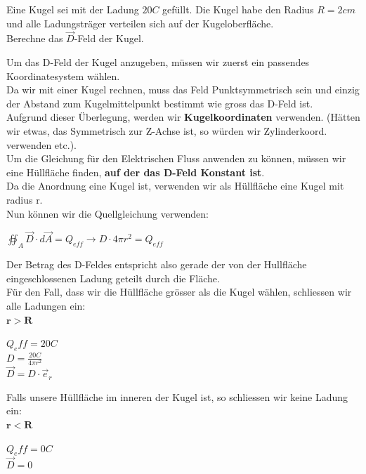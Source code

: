 \iend

\beginbsp
Eine Kugel sei mit der Ladung $20 C$ gefüllt. Die Kugel habe den Radius $R = 2cm$ und alle Ladungsträger verteilen sich auf der Kugeloberfläche. \\
Berechne das $\vec{D}$-Feld der Kugel.
\iend

\beginbsp
Um das D-Feld der Kugel anzugeben, müssen wir zuerst ein passendes Koordinatesystem wählen. \\
Da wir mit einer Kugel rechnen, muss das Feld Punktsymmetrisch sein und einzig der Abstand zum Kugelmittelpunkt bestimmt wie gross das D-Feld ist. \\
Aufgrund dieser Überlegung, werden wir \textbf{Kugelkoordinaten} verwenden. (Hätten wir etwas, das Symmetrisch zur Z-Achse ist, so würden wir Zylinderkoord. verwenden etc.). \\
Um die Gleichung für den Elektrischen Fluss anwenden zu können, müssen wir eine Hüllfläche finden,   \textbf{auf der das D-Feld Konstant ist}. \\
Da die Anordnung eine Kugel ist, verwenden wir als Hüllfläche eine Kugel mit radius r. \\
Nun können wir die Quellgleichung verwenden:
\begin{center}
	$ \oiint_A \vec{D}\cdot d\vec{A} = Q_{eff} \rightarrow D \cdot  4\pi r^2  = Q_{eff} $
\end{center}
Der Betrag des D-Feldes entspricht also gerade der von der Hullfläche eingeschlossenen Ladung geteilt durch die Fläche. \\
Für den Fall, dass wir die Hüllfläche grösser als die Kugel wählen, schliessen wir alle Ladungen ein: \\
$\mathbf{r > R}$ \\
\begin{center}
	$Q_eff = 20C$ \\
	$D = \frac{20C}{4\pi r^2}$ \\
	$\vec{D} = D \cdot \vec{e}_r$
\end{center}

Falls unsere Hüllfläche im inneren der Kugel ist, so schliessen wir keine Ladung ein: \\
$\mathbf{r < R}$ \\
\begin{center}
	$Q_eff = 0C$ \\
	$\vec{D} = 0$
\end{center}

